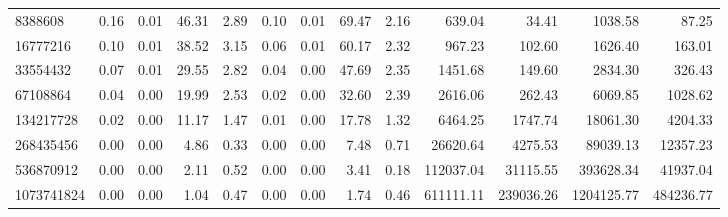 \begin{tabular}{lrrrrrrrrrrrr}
8388608 & 0.16 & 0.01 & 46.31 & 2.89 & 0.10 & 0.01 & 69.47 & 2.16 & 639.04 & 34.41 & 1038.58 & 87.25 \\
16777216 & 0.10 & 0.01 & 38.52 & 3.15 & 0.06 & 0.01 & 60.17 & 2.32 & 967.23 & 102.60 & 1626.40 & 163.01 \\
33554432 & 0.07 & 0.01 & 29.55 & 2.82 & 0.04 & 0.00 & 47.69 & 2.35 & 1451.68 & 149.60 & 2834.30 & 326.43 \\
67108864 & 0.04 & 0.00 & 19.99 & 2.53 & 0.02 & 0.00 & 32.60 & 2.39 & 2616.06 & 262.43 & 6069.85 & 1028.62 \\
134217728 & 0.02 & 0.00 & 11.17 & 1.47 & 0.01 & 0.00 & 17.78 & 1.32 & 6464.25 & 1747.74 & 18061.30 & 4204.33 \\
268435456 & 0.00 & 0.00 & 4.86 & 0.33 & 0.00 & 0.00 & 7.48 & 0.71 & 26620.64 & 4275.53 & 89039.13 & 12357.23 \\
536870912 & 0.00 & 0.00 & 2.11 & 0.52 & 0.00 & 0.00 & 3.41 & 0.18 & 112037.04 & 31115.55 & 393628.34 & 41937.04 \\
1073741824 & 0.00 & 0.00 & 1.04 & 0.47 & 0.00 & 0.00 & 1.74 & 0.46 & 611111.11 & 239036.26 & 1204125.77 & 484236.77 \\
\bottomrule
\end{tabular}
